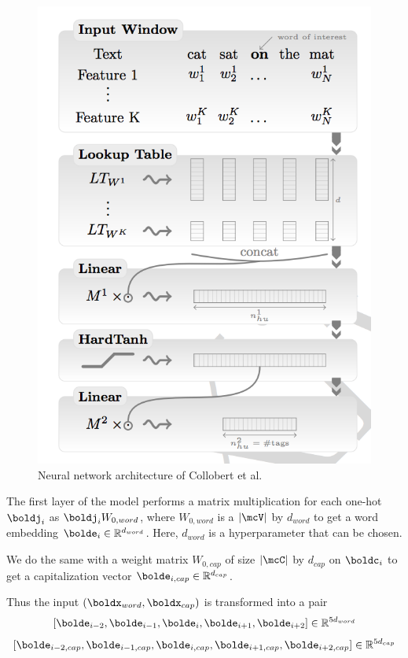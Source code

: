 \documentclass[11pt]{article}
\begin{document}
\begin{figure}
\centering
\includegraphics[scale=0.5]{collobert_network}
\caption{Neural network architecture of Collobert et al.}
\end{figure}

The first layer of the model performs a matrix multiplication for each one-hot $\boldj_i$ as $\boldj_iW_{0, word}$, where $W_{0, word}$ is a $|\mcV|$ by $d_{word}$ to get a word embedding $\bolde_i \in \mathbb{R}^{d_{word}}$. Here, $d_{word}$ is a hyperparameter that can be chosen.

We do the same with a weight matrix $W_{0, cap}$ of size $|\mcC|$ by $d_{cap}$ on $\boldc_i$ to get a capitalization vector $\bolde_{i, cap} \in \mathbb{R}^{d_{cap}}$.

Thus the input $(\boldx_{word}, \boldx_{cap})$ is transformed into a pair
$$[\bolde_{i-2}, \bolde_{i-1}, \bolde_{i}, \bolde_{i+1}, \bolde_{i+2}] \in \mathbb{R}^{5d_{word}}$$
$$[\bolde_{i-2, cap}, \bolde_{i-1, cap}, \bolde_{i, cap}, \bolde_{i+1, cap}, \bolde_{i+2, cap}] \in \mathbb{R}^{5d_{cap}}$$
\end{document}
